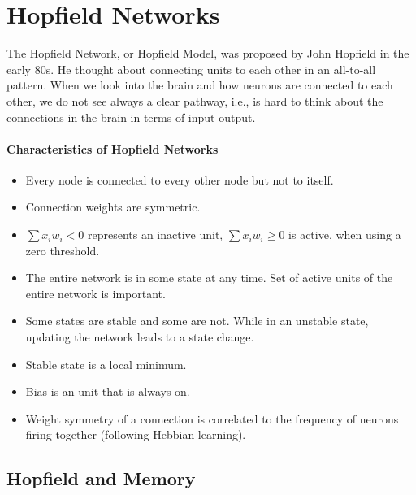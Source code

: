 \documentclass[main]{subfiles}
\begin{document}

\section{Hopfield Networks}

The Hopfield Network, or Hopfield Model, was proposed by John Hopfield in the early 80s.
He thought about connecting units to each other in an all-to-all pattern.
When we look into the brain and how neurons are connected to each other, we do not see always a clear pathway, i.e., is hard to think about the connections in the brain in terms of input-output.

\paragraph{Characteristics of Hopfield Networks}
\begin{itemize}[noitemsep,nolistsep]
	\item Every node is connected to every other node but not to itself.
	\item Connection weights are symmetric.
	\item $\sum x_i w_i < 0$ represents an inactive unit, $\sum x_i w_i \geq 0$ is active, when using a zero threshold.
	\item The entire network is in some state at any time. Set of active units of the entire network is important.
	\item Some states are stable and some are not. While in an unstable state, updating the network leads to a state change.
	\item Stable state is a local minimum.
	\item Bias is an unit that is always on.
	\item Weight symmetry of a connection is correlated to the frequency of neurons firing together (following Hebbian learning).
\end{itemize}

\subsection{Hopfield and Memory}
\end{document}
